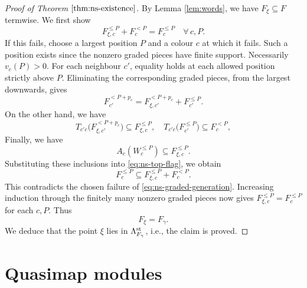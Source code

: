 \documentclass[11pt,reqno]{amsart}
\theoremstyle{definition}
\theoremstyle{remark}
\begin{document}
\begin{proof}[Proof of Theorem $\ref{thm:ns-existence}$]
By Lemma \ref{lem:words}, we have $F_\xi\subseteq F$ termwise.
We first show
\begin{equation}\label{eq:ns-graded-generation}
F_{\xi,c}^{\leqslant P}+F_c^{<P}=F_c^{\leqslant P}\quad\forall\,c,P.
\end{equation}
If this fails, choose a largest position $P$ and a colour $c$ at which it fails. 
Such a position exists since the
nonzero graded pieces have finite support. Necessarily $v_c(P)>0$.
For each neighbour $c'$, equality holds at each allowed position
strictly above $P$. Eliminating the corresponding graded pieces, from
the largest downwards, gives
\[
F_{c'}^{<P+p_c}=F_{\xi,c'}^{<P+p_c}+F_{c'}^{\leqslant P}.
\]
On the other hand, we have
\[
T_{c'c}\bigl(F_{\xi,c'}^{<P+p_c}\bigr)\subseteq F_{\xi,c}^{\leqslant P}
,\quad
T_{c'c}\bigl(F_{c'}^{\leqslant P}\bigr)\subseteq F_c^{<P},
\]
Finally, we have 
$$A_c(W_c^{\leqslant P})\subseteq F_{\xi,c}^{\leqslant P}.$$
Substituting these inclusions into \eqref{eq:ns-top-flag}, we obtain
\[
F_c^{\leqslant P}\subseteq F_{\xi,c}^{\leqslant P}+F_c^{<P}.
\]
This contradicts the chosen failure of \eqref{eq:ns-graded-generation}.
Increasing induction through the finitely many nonzero graded pieces
now gives $F_{\xi,c}^{\leqslant P}=F_c^{\leqslant P}$ for each $c,P$.
Thus 
$$F_\xi=F_\gamma.$$
We deduce that the point $\xi$ lies in
$\Lambda^{\rm st}_{F_\gamma}$, i.e., the claim is proved.
\end{proof}






\section{Quasimap modules}\label{sec:QMM}
\end{document}
